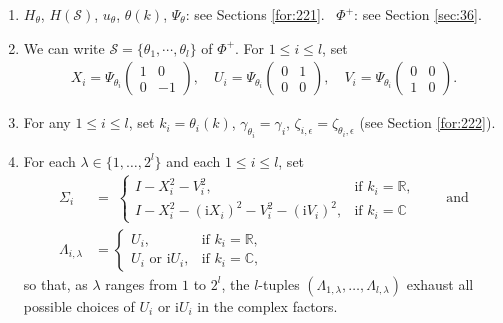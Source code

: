 \documentclass[11 pt]{amsart}
\newcommand{\RR}{\mathbb{R}}
\newcommand{\CC}{\mathbb{C}}
\theoremstyle{definition}
\numberwithin{equation}{section}
\begin{document}
\begin{enumerate}
  \item $H_\theta$, $H(\mathcal{S})$, $u_\theta$, $\theta(k)$, $\Psi_\theta$: see Sections \ref{for:221}. \, $\Phi^+$: see Section \ref{sec:36}.

  \item We can write $\mathcal{S}=\{\theta_1,\cdots, \theta_l\}$ of $\Phi^+$. For $1\le i\le l$,  set
  \begin{align*}
X_i=\Psi_{\theta_i}\begin{pmatrix}
  1 & 0 \\
  0 & -1
\end{pmatrix},\quad U_i=\Psi_{\theta_i}\begin{pmatrix}
  0 & 1 \\
  0 & 0
\end{pmatrix},\quad V_i=\Psi_{\theta_i}\begin{pmatrix}
  0 & 0 \\
  1 & 0
\end{pmatrix}.
  \end{align*}
\item For any $1\leq i\leq l$, set $k_i=\theta_i(k)$,  $\gamma_{\theta_i}=\gamma_i$,  $\zeta_{i,\epsilon}=\zeta_{\theta_i,\epsilon}$ (see Section \ref{for:222}).
  \item  For each $\lambda\in\{1,\dots,2^l\}$ and each $1\le i\le l$, set
\begin{align*}
 \Sigma_i&=\;
  \begin{cases}
    I - X_i^2 - V_i^2, &
      \text{if } k_i= \RR,\\[4pt]
    I - X_i^2 - (\mathrm{i}X_i)^2 - V_i^2 - (\mathrm{i}V_i)^2, &
      \text{if } k_i= \CC
  \end{cases}\qquad \text{and}\\
  \Lambda_{i,\lambda}&=
  \begin{cases}
    U_i, & \text{if } k_i=\RR,\\[4pt]
    U_i \text{ or } \mathrm{i}U_i, & \text{if } k_i=\CC,
  \end{cases}
\end{align*}
so that, as $\lambda$ ranges from $1$ to $2^l$, the $l$-tuples
$(\Lambda_{1,\lambda},\dots,\Lambda_{l,\lambda})$ exhaust all possible choices
of $U_i$ or $\mathrm{i}U_i$ in the complex factors.








\end{enumerate}
\end{document}
